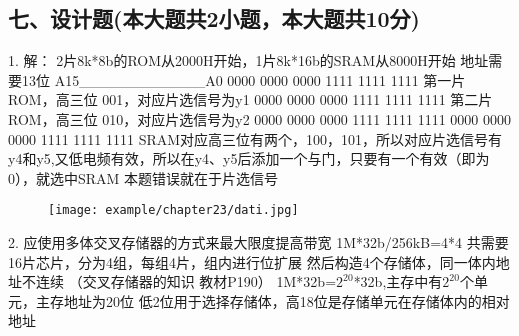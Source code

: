 \subsection{七、设计题(本大题共2小题，本大题共10分)}
1.\newline
解：\newline
2片8k*8b的ROM从2000H开始，1片8k*16b的SRAM从8000H开始\newline
地址需要13位\newline
A15\_\_\_\_\_\_\_\_\_\_\_\_A0 0000 0000 0000 1111 1111 1111    第一片ROM，高三位 001，对应片选信号为y1 0000 0000 0000 1111 1111 1111    第二片ROM，高三位 010，对应片选信号为y2 0000 0000 0000 1111 1111 1111 0000 0000 0000 1111 1111 1111    SRAM对应高三位有两个，100，101，所以对应片选信号有y4和y5,又低电频有效，所以在y4、y5后添加一个与门，只要有一个有效（即为0），就选中SRAM\newline
本题错误就在于片选信号\newline
\begin{figure}[H]
	\centering  %
	\texttt{[image: example/chapter23/dati.jpg]}
\end{figure}
2.\newline
应使用多体交叉存储器的方式来最大限度提高带宽\newline
1M*32b/256kB=4*4\newline
共需要16片芯片，分为4组，每组4片，组内进行位扩展\newline
然后构造4个存储体，同一体内地址不连续\newline
（交叉存储器的知识 教材P190）\newline
1M*32b=$2^20$*32b,主存中有$2^20$个单元，主存地址为20位\newline
低2位用于选择存储体，高18位是存储单元在存储体内的相对地址\newline

